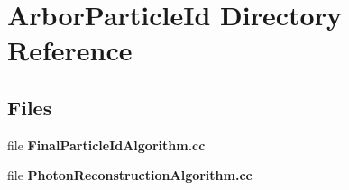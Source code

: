 \section{Arbor\+Particle\+Id Directory Reference}
\label{dir_cd03a81fe228985057c5028831975280}
\subsection*{Files}
\begin{DoxyCompactItemize}
\item 
file {\bf Final\+Particle\+Id\+Algorithm.\+cc}
\item 
file {\bf Photon\+Reconstruction\+Algorithm.\+cc}
\end{DoxyCompactItemize}
